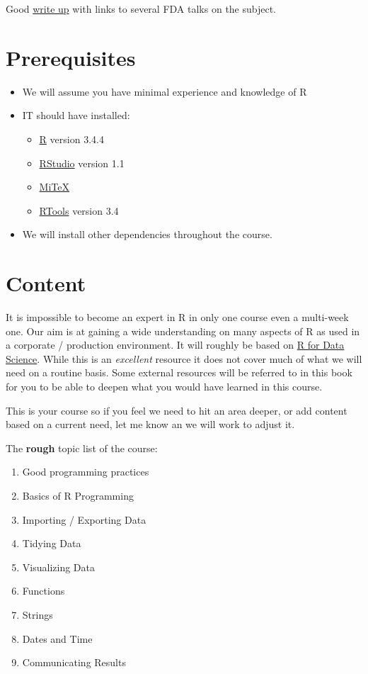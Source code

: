 \documentclass[]{book}
\providecommand{\tightlist}{%
  \setlength{\itemsep}{0pt}\setlength{\parskip}{0pt}}
\theoremstyle{definition}
\theoremstyle{definition}
\theoremstyle{definition}
\theoremstyle{remark}
\begin{document}
Good \href{http://blog.revolutionanalytics.com/2017/06/r-fda.html}{write
up} with links to several FDA talks on the subject.

\section{Prerequisites}\label{prerequisites}

\begin{itemize}
\tightlist
\item
  We will assume you have minimal experience and knowledge of R
\item
  IT should have installed:

  \begin{itemize}
  \tightlist
  \item
    \href{https://cran.r-project.org/}{R} version 3.4.4
  \item
    \href{https://www.rstudio.com/products/rstudio/download/\#download}{RStudio}
    version 1.1
  \item
    \href{https://miktex.org/}{MiTeX}
  \item
    \href{https://cran.r-project.org/bin/windows/Rtools/}{RTools}
    version 3.4
  \end{itemize}
\item
  We will install other dependencies throughout the course.
\end{itemize}

\section{Content}\label{content}

It is impossible to become an expert in R in only one course even a
multi-week one. Our aim is at gaining a wide understanding on many
aspects of R as used in a corporate / production environment. It will
roughly be based on \href{http://r4ds.had.co.nz}{R for Data Science}.
While this is an \emph{excellent} resource it does not cover much of
what we will need on a routine basis. Some external resources will be
referred to in this book for you to be able to deepen what you would
have learned in this course.

This is your course so if you feel we need to hit an area deeper, or add
content based on a current need, let me know an we will work to adjust
it.

The \textbf{rough} topic list of the course:

\begin{enumerate}
\def\labelenumi{\arabic{enumi}.}
\tightlist
\item
  Good programming practices
\item
  Basics of R Programming
\item
  Importing / Exporting Data
\item
  Tidying Data
\item
  Visualizing Data
\item
  Functions
\item
  Strings
\item
  Dates and Time
\item
  Communicating Results
\end{enumerate}
\end{document}
